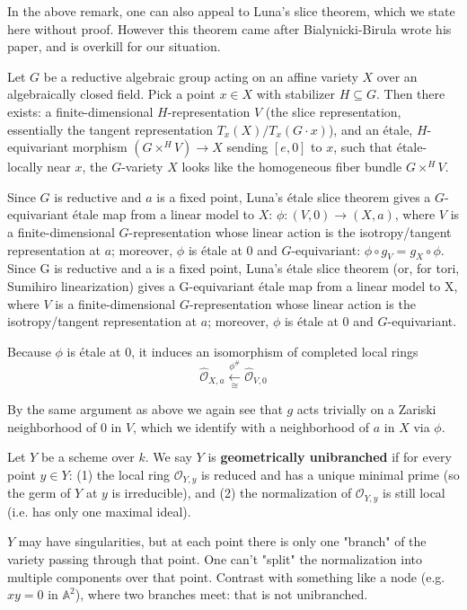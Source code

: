 \documentclass[12pt]{article}
\begin{document}
\begin{remark}
    In the above remark, one can also appeal to Luna's slice theorem, which we state here without proof. However this theorem came after Bialynicki-Birula wrote his paper, and is overkill for our situation.
    \begin{adjustwidth}{2em}{0pt}
\vspace{-\parskip}
\vspace{-16pt}
\begin{theorem}
    Let $G$ be a reductive algebraic group acting on an affine variety $X$ over an algebraically closed field. Pick a point $x \in X$ with stabilizer $H \subseteq G$. Then there exists: a finite-dimensional $H$-representation $V$ (the slice representation, essentially the tangent representation $T_x(X)/T_x(G\cdot x)$), and an étale, $H$-equivariant morphism $(G \times^H V) \longrightarrow X$ sending $[e,0]$ to $x$, such that étale-locally near $x$, the $G$-variety $X$ looks like the homogeneous fiber bundle $G \times^H V$.
\end{theorem}
\end{adjustwidth}
Since $G$ is reductive and $a$ is a fixed point, Luna's étale slice theorem gives a $G$-equivariant étale map from a linear model to $X$: $\phi:(V,0)\longrightarrow (X,a)$, where $V$ is a finite-dimensional $G$-representation whose linear action is the isotropy/tangent representation at $a$; moreover, $\phi$ is étale at $0$ and $G$-equivariant: $\phi\circ g_V = g_X\circ \phi$.
Since G is reductive and a is a fixed point, Luna’s étale slice theorem (or, for tori, Sumihiro linearization) gives a G-equivariant étale map from a linear model to X, where $V$ is a finite-dimensional $G$-representation whose linear action is the isotropy/tangent representation at $a$; moreover, $\phi$ is étale at $0$ and $G$-equivariant.

Because $\phi$ is étale at $0$, it induces an isomorphism of completed local rings \[\widehat{\mathcal O}_{X,a}\xleftarrow[\cong]{\phi^\#} \widehat{\mathcal O}_{V,0}\] 

By the same argument as above we again see that $g$ acts trivially on a Zariski neighborhood of $0$ in $V$, which we identify with a neighborhood of $a$ in $X$ via $\phi$.
\end{remark}

\begin{definition}
    Let $Y$ be a scheme over $k$. We say $Y$ is \textbf{geometrically unibranched} if for every point $y \in Y$: (1) the local ring $\mathcal{O}_{Y,y}$ is reduced and has a unique minimal prime (so the germ of $Y$ at $y$ is irreducible), and (2) the normalization of $\mathcal{O}_{Y,y}$ is still local (i.e. has only one maximal ideal).
\end{definition}
$Y$ may have singularities, but at each point there is only one "branch" of the variety passing through that point. One can't "split" the normalization into multiple components over that point. Contrast with something like a node (e.g. $xy=0$ in $\mathbb{A}^2$), where two branches meet: that is not unibranched.
\end{document}
